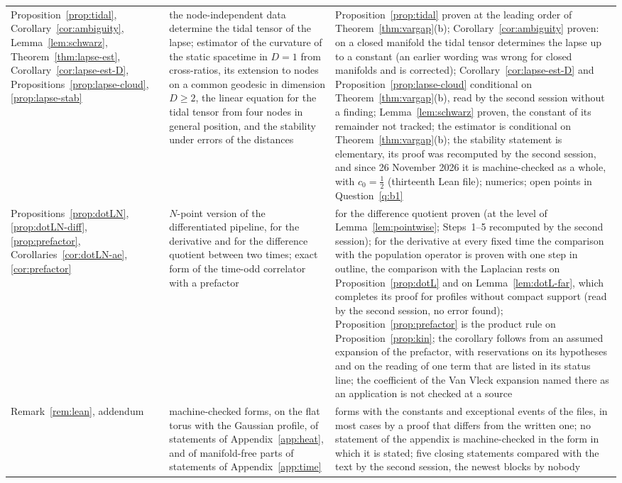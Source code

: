 \documentclass[11pt,a4paper]{article}
\theoremstyle{stmt}
\theoremstyle{defn}
\theoremstyle{rmk}
\numberwithin{equation}{section}
\begin{document}
{\begin{longtable}{@{}>{\raggedright\arraybackslash}p{}>{\raggedright\arraybackslash}p{}>{\raggedright\arraybackslash}p{}@{}}
Proposition~\ref{prop:tidal}, Corollary~\ref{cor:ambiguity}, Lemma~\ref{lem:schwarz}, Theorem~\ref{thm:lapse-est}, Corollary~\ref{cor:lapse-est-D}, Propositions~\ref{prop:lapse-cloud}, \ref{prop:lapse-stab} & the node-independent data determine the tidal tensor of the lapse; estimator of the curvature of the static spacetime in $D=1$ from cross-ratios, its extension to nodes on a common geodesic in dimension $D\ge2$, the linear equation for the tidal tensor from four nodes in general position, and the stability under errors of the distances & Proposition~\ref{prop:tidal} proven at the leading order of Theorem~\ref{thm:vargap}(b); Corollary~\ref{cor:ambiguity} proven: on a closed manifold the tidal tensor determines the lapse up to a constant (an earlier wording was wrong for closed manifolds and is corrected); Corollary~\ref{cor:lapse-est-D} and Proposition~\ref{prop:lapse-cloud} conditional on Theorem~\ref{thm:vargap}(b), read by the second session without a finding; Lemma~\ref{lem:schwarz} proven, the constant of its remainder not tracked; the estimator is conditional on Theorem~\ref{thm:vargap}(b); the stability statement is elementary, its proof was recomputed by the second session, and since 26 November 2026 it is machine-checked as a whole, with $c_0=\frac12$ (thirteenth Lean file); numerics; open points in Question~\ref{q:b1}\\
Propositions~\ref{prop:dotLN}, \ref{prop:dotLN-diff}, \ref{prop:prefactor}, Corollaries~\ref{cor:dotLN-ae}, \ref{cor:prefactor} & $N$-point version of the differentiated pipeline, for the derivative and for the difference quotient between two times; exact form of the time-odd correlator with a prefactor & for the difference quotient proven (at the level of Lemma~\ref{lem:pointwise}; Steps~1--5 recomputed by the second session); for the derivative at every fixed time the comparison with the population operator is proven with one step in outline, the comparison with the Laplacian rests on Proposition~\ref{prop:dotL} and on Lemma~\ref{lem:dotL-far}, which completes its proof for profiles without compact support (read by the second session, no error found); Proposition~\ref{prop:prefactor} is the product rule on Proposition~\ref{prop:kin}; the corollary follows from an assumed expansion of the prefactor, with reservations on its hypotheses and on the reading of one term that are listed in its status line; the coefficient of the Van Vleck expansion named there as an application is not checked at a source\\
Remark~\ref{rem:lean}, addendum & machine-checked forms, on the flat torus with the Gaussian profile, of statements of Appendix~\ref{app:heat}, and of manifold-free parts of statements of Appendix~\ref{app:time} & forms with the constants and exceptional events of the files, in most cases by a proof that differs from the written one; no statement of the appendix is machine-checked in the form in which it is stated; five closing statements compared with the text by the second session, the newest blocks by nobody\\
\end{longtable}}
\end{document}
